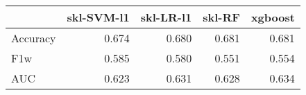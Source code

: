 \begin{tabular}{lrrrr}
\toprule
{} &  skl-SVM-l1 &  skl-LR-l1 &  skl-RF &  xgboost \\
\midrule
Accuracy &       0.674 &      0.680 &   0.681 &    0.681 \\
F1w      &       0.585 &      0.580 &   0.551 &    0.554 \\
AUC      &       0.623 &      0.631 &   0.628 &    0.634 \\
\bottomrule
\end{tabular}
